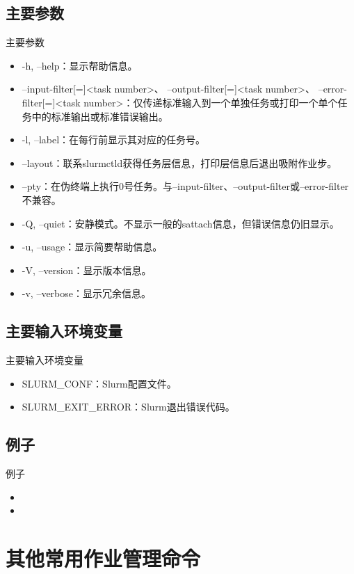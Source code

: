 \subsection{主要参数}
\begin{frame}{主要参数}
\begin{itemize}
      \item -h, --help：显示帮助信息。
      \item --input-filter[=]<task number>、 --output-filter[=]<task number>、 --error-filter[=]<task number>：仅传递标准输入到一个单独任务或打印一个单个任务中的标准输出或标准错误输出。
      \item -l, --label：在每行前显示其对应的任务号。
      \item --layout：联系slurmctld获得任务层信息，打印层信息后退出吸附作业步。
      \item --pty：在伪终端上执行0号任务。与--input-filter、--output-filter或--error-filter不兼容。
      \item -Q, --quiet：安静模式。不显示一般的sattach信息，但错误信息仍旧显示。
      \item -u, --usage：显示简要帮助信息。
      \item -V, --version：显示版本信息。
      \item -v, --verbose：显示冗余信息。
\end{itemize}
\end{frame}

\subsection{主要输入环境变量}
\begin{frame}{主要输入环境变量}
\begin{itemize}
	\item SLURM\_CONF：Slurm配置文件。
    \item SLURM\_EXIT\_ERROR：Slurm退出错误代码。
\end{itemize}
\end{frame}

\subsection{例子}
\begin{frame}{例子}
\begin{itemize}
	\item {}
    \item {}
\end{itemize}

\section{其他常用作业管理命令}
\end{frame}
